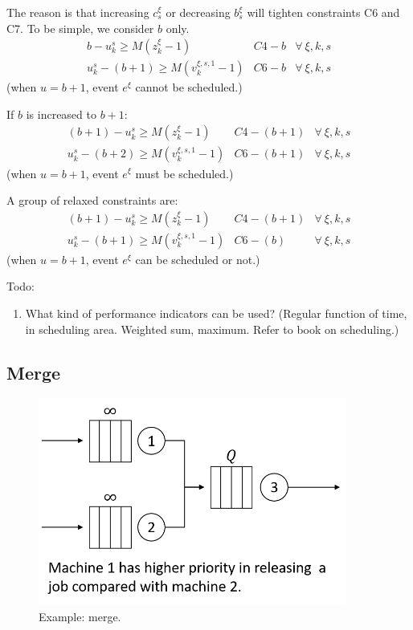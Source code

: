 \documentclass[]{interact}
\theoremstyle{plain}%
\theoremstyle{definition}
\theoremstyle{remark}
\begin{document}
The reason is that increasing $c^{\xi}_s$ or decreasing $b^{\xi}_s$ will tighten constraints C6 and C7. To be simple, we consider $b$ only. 
\begin{eqnarray}
b - u^s_k \ge M(z^{\xi}_{k}-1)&C4-b& \forall\ \xi, k,s\\
u^s_k -  (b+1) \ge M(v^{\xi,s,1}_k-1) &C6-b& \forall\ \xi,k,s
\end{eqnarray}
(when $u=b+1$, event $e^{\xi}$ cannot be scheduled.)

If $b$ is increased to $b+1$:
\begin{eqnarray}
(b+1) - u^s_k \ge M(z^{\xi}_{k}-1)&C4-(b+1)& \forall\ \xi, k,s\\
u^s_k -  (b+2) \ge M(v^{\xi,s,1}_k-1) &C6-(b+1)& \forall\ \xi,k,s
\end{eqnarray}
(when $u=b+1$, event $e^{\xi}$ must be scheduled.)

A group of relaxed constraints are:
\begin{eqnarray}
(b+1) - u^s_k \ge M(z^{\xi}_{k}-1)&C4-(b+1)& \forall\ \xi, k,s\\
u^s_k -  (b+1) \ge M(v^{\xi,s,1}_k-1) &C6-(b)& \forall\ \xi,k,s
\end{eqnarray}
(when $u=b+1$, event $e^{\xi}$ can be scheduled or not.)


Todo: 
\begin{enumerate}
	\item What kind of performance indicators can be used? (Regular function of time, in scheduling area. Weighted sum, maximum. Refer to book on scheduling.)
\end{enumerate}

\newpage

\subsection{Merge}
\begin{figure}[h]
	\centering
	\includegraphics[width=0.9\textwidth]{Figures/merge.png}
	\caption{Example: merge.}
\end{figure}
\end{document}
